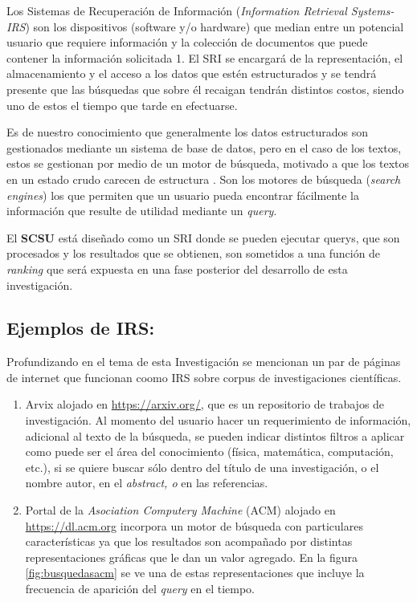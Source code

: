 \documentclass[
  12pt,
  openany]{book}
\begin{document}
Los Sistemas de Recuperación de Información (\emph{Information Retrieval Systems-IRS}) son los dispositivos (software y/o hardware) que median entre un potencial usuario que requiere información y la colección de documentos que puede contener la información solicitada \citep{kraft2017} 1. El SRI se encargará de la representación, el almacenamiento y el acceso a los datos que estén estructurados y se tendrá presente que las búsquedas que sobre él recaigan tendrán distintos costos, siendo uno de estos el tiempo que tarde en efectuarse.

Es de nuestro conocimiento que generalmente los datos estructurados son gestionados mediante un sistema de base de datos, pero en el caso de los textos, estos se gestionan por medio de un motor de búsqueda, motivado a que los textos en un estado crudo carecen de estructura \citep{miningt2012} . Son los motores de búsqueda (\emph{search engines}) los que permiten que un usuario pueda encontrar fácilmente la información que resulte de utilidad mediante un \emph{query}.

El \textbf{SCSU} está diseñado como un SRI donde se pueden ejecutar querys, que son procesados y los resultados que se obtienen, son sometidos a una función de \emph{ranking} que será expuesta en una fase posterior del desarrollo de esta investigación.

\hypertarget{ejemplos-de-irs}{%
\subsection{Ejemplos de IRS:}\label{ejemplos-de-irs}}

Profundizando en el tema de esta Investigación se mencionan un par de páginas de internet que funcionan coomo IRS sobre corpus de investigaciones científicas.

\begin{enumerate}
\def\labelenumi{\arabic{enumi}.}
\item
  Arvix alojado en \url{https://arxiv.org/}, que es un repositorio de trabajos de investigación. Al momento del usuario hacer un requerimiento de información, adicional al texto de la búsqueda, se pueden indicar distintos filtros a aplicar como puede ser el área del conocimiento (física, matemática, computación, etc.), si se quiere buscar sólo dentro del título de una investigación, o el nombre autor, en el \emph{abstract, o} en las referencias.
\item
  Portal de la \emph{Asociation Computery Machine} (ACM) alojado en \url{https://dl.acm.org} incorpora un motor de búsqueda con particulares características ya que los resultados son acompañado por distintas representaciones gráficas que le dan un valor agregado. En la figura \ref{fig:busquedasacm} se ve una de estas representaciones que incluye la frecuencia de aparición del \emph{query} en el tiempo.
\end{enumerate}
\end{document}
